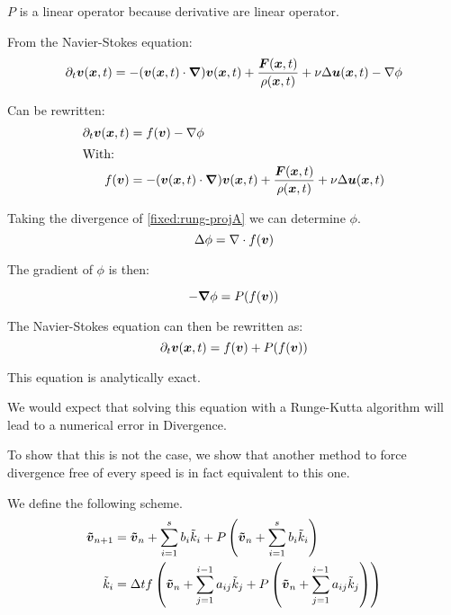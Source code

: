 $P$ is a linear operator because derivative are linear operator.

From the Navier-Stokes equation:
\begin{equation}
  \partial_t {\boldsymbol {v}}({\boldsymbol {x}} ,t)=-({\boldsymbol {v}}({\boldsymbol {x}},t)\cdot{\boldsymbol {\nabla}} ) {\boldsymbol {v}}({\boldsymbol {x}} ,t)+\frac{{\boldsymbol {F}}({\boldsymbol {x}},t)}{\rho({\boldsymbol {x}},t)}+\nu \Delta {\boldsymbol {u}}({\boldsymbol {x}},t)-\nabla \phi
\end{equation}

Can be rewritten:
\begin{align}
\label{fixed:rung-projA}
  \partial_t {\boldsymbol {v}}({\boldsymbol {x}} ,t)&=f({\boldsymbol {v}})-\nabla \phi \\
  \intertext{With:}
  f({\boldsymbol {v}})&=-({\boldsymbol {v}}({\boldsymbol {x}},t)\cdot{\boldsymbol {\nabla}} ) {\boldsymbol {v}}({\boldsymbol {x}} ,t)+\frac{{\boldsymbol {F}}({\boldsymbol {x}},t)}{\rho({\boldsymbol {x}},t)}+\nu \Delta {\boldsymbol {u}}({\boldsymbol {x}},t)
\end{align}

Taking the divergence of \ref{fixed:rung-projA} we can determine $\phi$.
\begin{equation}
  \Delta \phi=\nabla \cdot f({\boldsymbol {v}})
\end{equation}

The gradient of $\phi$ is then:

\begin{equation}
  -{\boldsymbol {\nabla}}\phi=P(f({\boldsymbol {v}}))
\end{equation}

The Navier-Stokes equation can then be rewritten as:
\begin{equation}\label{fixed:simpl_navier}
\partial_t {\boldsymbol {v}}({\boldsymbol {x}} ,t)=f({\boldsymbol {v}})+P(f({\boldsymbol {v}})) 
\end{equation}

This equation is analytically exact.

We would expect that solving this equation with a Runge-Kutta algorithm will lead to a numerical error in Divergence.

To show that this is not the case, we show that another method to force divergence free of every speed is in fact equivalent to this one.

We define the following scheme.
\begin{align}
{\boldsymbol {\tilde{v}}}_{n+1}&={\boldsymbol {\tilde{v}}}_{n}+\sum_{i=1}^{s}b_{i}\tilde{k}_{i}+P\left({\boldsymbol {\tilde{v}}}_{n}+\sum_{i=1}^{s}b_{i}\tilde{k}_{i}\right)\\
\tilde{k}_{i}&=\Delta t f\left({\boldsymbol {\tilde{v}}}_{n}+\sum_{j=1}^{i-1}a_{ij}\tilde{k}_{j}+P\left({\boldsymbol {\tilde{v}}}_{n}+\sum_{j=1}^{i-1}a_{ij}\tilde{k}_{j}\right)\right)
\end{align}


